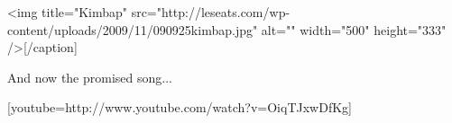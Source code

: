 \begin{post}
\begin{content}
[caption id="" align="aligncenter" width="500" caption="Kimbap (source: http://leseats.com)"]<img title="Kimbap" src="http://leseats.com/wp-content/uploads/2009/11/090925kimbap.jpg" alt="" width="500" height="333" />[/caption]



And now the promised song...



[youtube=http://www.youtube.com/watch?v=OiqTJxwDfKg] 
	\end{content}
\end{post}
